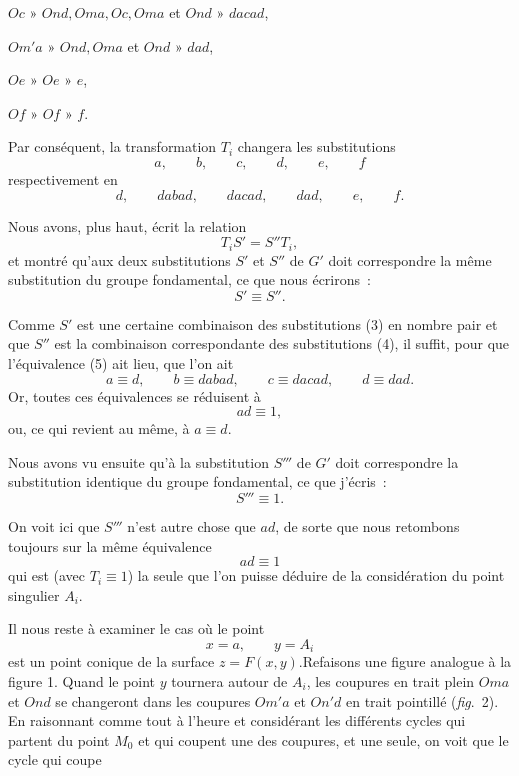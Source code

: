 \documentclass{article}
\begin{document}
$Oc$ » $Ond, Oma, Oc, Oma$ et $Ond$ » $dacad$,

$Om'a$ » $Ond, Oma$ et $Ond$ » $dad$,

$Oe$ » $Oe$ » $e$,

$Of$ » $Of$ » $f$.

Par conséquent, la transformation $T_{i}$ changera les substitutions
\[ a, \qquad b, \qquad c, \qquad d, \qquad e, \qquad f \tag{3} \]
respectivement en
\[ d, \qquad dabad, \qquad dacad, \qquad dad, \qquad e, \qquad f. \tag{4} \]


Nous avons, plus haut, écrit la relation
\[ T_{i}S' = S''T_{i}, \]
et montré qu'aux deux substitutions $S'$ et $S''$ de $G'$ doit correspondre la même substitution du groupe fondamental, ce que nous écrirons~:
\[ S' \equiv S''. \tag{5} \]

Comme $S'$ est une certaine combinaison des substitutions (3) en nombre pair et que $S''$ est la combinaison correspondante des substitutions (4), il suffit, pour que l'équivalence (5) ait lieu, que l'on ait
\[ a \equiv d, \qquad b \equiv dabad, \qquad c \equiv dacad, \qquad d \equiv dad. \]
Or, toutes ces équivalences se réduisent à
\[ ad \equiv 1, \]
ou, ce qui revient au même, à $a \equiv d$.

Nous avons vu ensuite qu'à la substitution $S'''$ de $G'$ doit correspondre la substitution identique du groupe fondamental, ce que j'écris~:
\[ S''' \equiv 1. \]

On voit ici que $S'''$ n'est autre chose que $ad$, de sorte que nous retombons toujours sur la même équivalence
\[ ad \equiv 1 \]
qui est (avec $T_{i} \equiv 1$) la seule que l'on puisse déduire de la considération du point singulier $A_{i}$.

Il nous reste à examiner le cas où le point
\[ x = a, \qquad y = A_{i} \]
est un point conique de la surface $z = F(x, y)$.Refaisons une figure analogue à la figure 1. Quand le point $y$ tournera autour de $A_{i}$, les coupures en trait plein $Oma$ et $Ond$ se changeront dans les coupures $Om'a$ et $On'd$ en trait pointillé (\emph{fig}.\ 2). En
raisonnant comme tout à l'heure et considérant les différents cycles
qui partent du point $M_{0}$ et qui coupent une des coupures, et une seule, on voit que le cycle qui coupe
\end{document}
